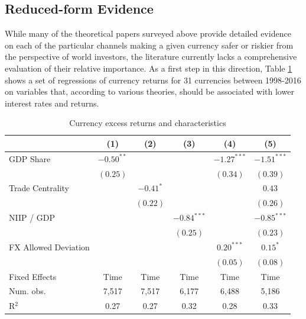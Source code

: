 \documentclass{ar-1col}
\begin{document}
\subsection{Reduced-form Evidence}

While many of the theoretical papers surveyed above provide detailed evidence on each of the particular channels making a given currency safer or riskier from the perspective of world investors, the literature currently lacks a comprehensive evaluation of their relative importance. As a first step in this direction, Table \ref{table:rx_char} shows a set of regressions of currency returns for 31 currencies between 1998-2016 on variables that, according to various theories, should be associated with lower interest rates and returns. 
\begin{table}[htp]
\begin{center}
\caption{Currency excess returns and characteristics}
\label{table:rx_char}
\vspace{1em}
\begin{tabular}{l c c c c c }
\hline
\hline
 & (1) & (2) & (3) & (4) & (5) \\
\hline
GDP Share               & $-0.50^{**}$ &             &               & $-1.27^{***}$ & $-1.51^{***}$ \\
                        & $(0.25)$     &             &               & $(0.34)$      & $(0.39)$      \\
Trade Centrality              &              & $-0.41^{*}$ &               &               & $0.43$        \\
                        &              & $(0.22)$    &               &               & $(0.26)$      \\
NIIP / GDP              &              &             & $-0.84^{***}$ &               & $-0.85^{***}$ \\
                        &              &             & $(0.25)$      &               & $(0.23)$      \\
FX Allowed Deviation         &              &             &               & $0.20^{***}$  & $0.15^{*}$    \\
                        &              &             &               & $(0.05)$      & $(0.08)$      \\
\hline
Fixed Effects & Time & Time & Time & Time & Time \\
Num. obs.     & 7,517        & 7,517     & 6,177          & 6,488          & 5,186          \\
R$^2$         & 0.27        & 0.27     & 0.32          & 0.28          & 0.33          \\

\end{tabular}
\end{center}
\end{table}
\end{document}
